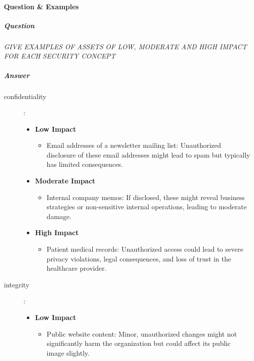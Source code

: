 \documentclass{article}
\begin{document}
        \paragraph{Question \& Examples}
            \subparagraph{Question} \textit{GIVE EXAMPLES OF ASSETS OF LOW, MODERATE AND HIGH IMPACT FOR EACH SECURITY CONCEPT}
            \subparagraph{Answer} 
                        \begin{description}
                            \item[confidentiality]: \\
                            \begin{itemize}
                                \item \textbf{Low Impact}
                                \begin{itemize}
                                    \item Email addresses of a newsletter mailing list: Unauthorized disclosure of these email addresses might lead to spam but typically has limited consequences.
                                \end{itemize}
                            
                                \item \textbf{Moderate Impact}
                                \begin{itemize}
                                    \item Internal company memos: If disclosed, these might reveal business strategies or non-sensitive internal operations, leading to moderate damage.
                                \end{itemize}
                            
                                \item \textbf{High Impact}
                                \begin{itemize}
                                    \item Patient medical records: Unauthorized access could lead to severe privacy violations, legal consequences, and loss of trust in the healthcare provider.
                                \end{itemize} 
                            \end{itemize}    
                            \item[integrity]: \\
                            \begin{itemize}
                                \item \textbf{Low Impact}
                                \begin{itemize}
                                    \item Public website content: Minor, unauthorized changes might not significantly harm the organization but could affect its public image slightly.
                                \end{itemize}
                            

\end{itemize}
\end{description}
\end{document}
